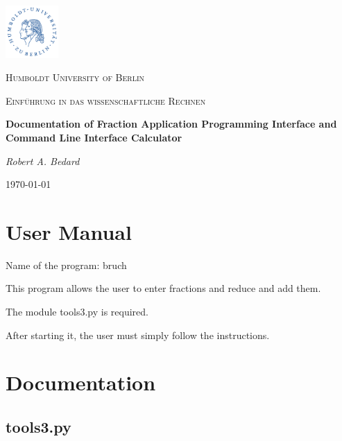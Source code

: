 \documentclass[refman]{scrartcl}
\begin{document}

\begin{titlepage}
	\centering
	\includegraphics[width=0.15\textwidth]{graphics/huberlin_logo}\par\vspace{1cm}
	{\scshape\LARGE Humboldt University of Berlin \par}
	\vspace{1cm}
	{\scshape\Large Einf{\"u}hrung in das wissenschaftliche Rechnen \par}
	\vspace{1.5cm}
	{\huge\bfseries Documentation of Fraction Application Programming Interface and Command Line Interface Calculator\par}
	\vspace{2cm}
	{\Large\itshape Robert A. Bedard \par}
	\vfill

	\vfill

	{\large \today\par}
\end{titlepage}

\tableofcontents
\newpage

\section{User Manual}
Name of the program: bruch

\noindent This program allows the user to enter fractions and reduce and add them.

\noindent The module tools3.py is required.

\noindent After starting it, the user must simply follow the instructions.
\section{Documentation}

\subsection{tools3.py}
\end{document}
